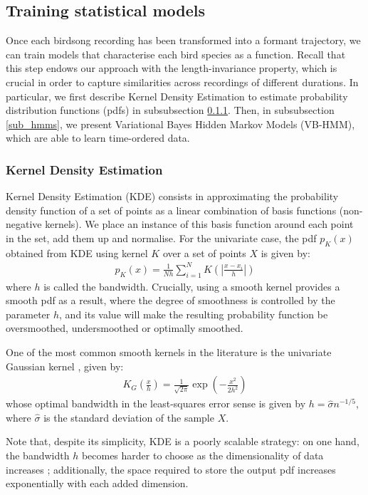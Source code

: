 \documentclass[pdftex,11pt,a4paper]{article}
\theoremstyle{definition}
\theoremstyle{remark}
\begin{document}
\subsection{Training statistical models}
Once each birdsong recording has been transformed into a formant trajectory, we can train models that characterise each bird species as a function. Recall that this step endows our approach with the length-invariance property, which is crucial in order to capture similarities across recordings of different durations. In particular, we first describe Kernel Density Estimation to estimate probability distribution functions (pdfs) in subsubsection \ref{sub_kde}. Then, in subsubsection \ref{sub_hmms}, we present Variational Bayes Hidden Markov Models (VB-HMM), which are able to learn time-ordered data. 

\subsubsection{Kernel Density Estimation}
\label{sub_kde}
\par Kernel Density Estimation (KDE) consists in approximating the probability density function of a set of points as a linear combination of basis functions (non-negative kernels). We place an instance of this basis function around each point in the set, add them up and normalise. For the univariate case, the pdf $p_K(x)$ obtained from KDE using kernel $K$ over a set of points $X$ is given by:
\begin{align*}
p_K(x) = \frac{1}{Nh}\sum_{i=1}^NK\left(\left|\frac{x - x_i}{h}\right|\right)
\end{align*}
where $h$ is called the bandwidth. Crucially, using a smooth kernel provides a smooth pdf as a result, where the degree of smoothness is controlled by the parameter $h$, and its value will make the resulting probability function be oversmoothed, undersmoothed or optimally smoothed.
\par One of the most common smooth kernels in the literature is the univariate Gaussian kernel \cite{hastie2008}, given by:
\begin{align*}
K_G\left(\frac{x}{h}\right) = \frac{1}{\sqrt{2\pi}}\exp{\left(-\frac{x^2}{2h^2}\right)}
\end{align*}
whose optimal bandwidth in the least-squares error sense is given by $h = \hat{\sigma}n^{-1/5}$, where $\hat{\sigma}$ is the standard deviation of the sample $X$.
\par Note that, despite its simplicity, KDE is a poorly scalable strategy: on one hand, the bandwidth $h$ becomes harder to choose as the dimensionality of data increases \cite{Hansen2009}; additionally, the space required to store the output pdf increases exponentially with each added dimension.
\end{document}
